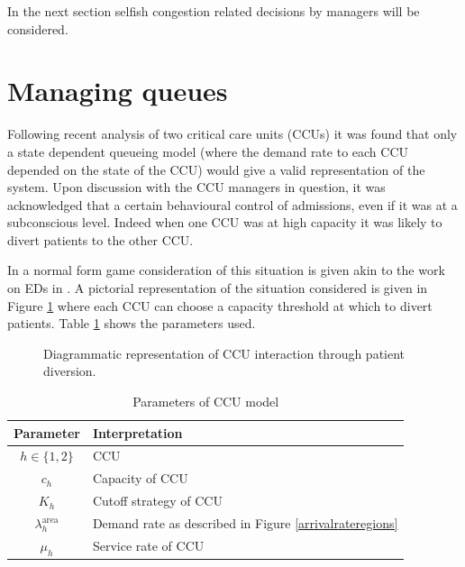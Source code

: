 \documentclass[a4paper,11pt]{article}
\begin{document}
In the next section selfish congestion related decisions by managers will be considered.

\section{Managing queues}\label{sec:managingqueues}

Following recent analysis of two critical care units (CCUs) it was found that only a state dependent queueing model (where the demand rate to each CCU depended on the state of the CCU) would give a valid representation of the system.
Upon discussion with the CCU managers in question, it was acknowledged that a certain behavioural control of admissions, even if it was at a subconscious level.
Indeed when one CCU was at high capacity it was likely to divert patients to the other CCU.

In \cite{knight2014} a normal form game consideration of this situation is given akin to the work on EDs in \cite{Deo2011}.
A pictorial representation of the situation considered is given in Figure \ref{diagramofdiversion} where each CCU can choose a capacity threshold at which to divert patients.
Table \ref{tab:parameters1} shows the parameters used.

\begin{figure}[!htbp]
\begin{center}
\caption{Diagrammatic representation of CCU interaction through patient diversion.}\label{diagramofdiversion}
\end{center}
\end{figure}


\begin{table}[!hbtp]
\begin{center}
\begin{tabular}{cl}
\toprule
Parameter & Interpretation\\
\midrule
$h\in\{1,2\}$& CCU\\
$c_h$& Capacity of CCU\\
$K_h$& Cutoff strategy of CCU\\
$\lambda_{h}^{\text{area}}$& Demand rate as described in Figure \ref{arrivalrateregions}\\
$\mu_{h}$&Service rate of CCU\\
\toprule
\end{tabular}
\caption{Parameters of CCU model}\label{tab:parameters1}
\end{center}
\end{table}
\end{document}
